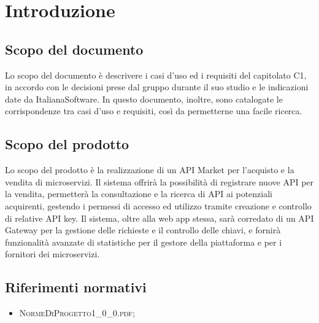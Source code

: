 \newpage
\section{Introduzione}

\subsection{Scopo del documento}
Lo scopo del documento è descrivere i casi d'uso ed i requisiti del capitolato C1, in accordo con le decisioni prese dal gruppo durante il suo studio e le indicazioni date da ItalianaSoftware. In questo documento, inoltre, sono catalogate le corrispondenze tra casi d'uso e requisiti, così da permetterne una facile ricerca.

\subsection{Scopo del prodotto}
Lo scopo del prodotto è la realizzazione di un API Market per l'acquisto e la vendita di microservizi. Il sistema offrirà la possibilità di registrare nuove API per la vendita, permetterà la consultazione e la ricerca di API ai potenziali acquirenti, gestendo i permessi di accesso ed utilizzo tramite creazione e controllo di relative API key. Il sistema, oltre alla web app stessa, sarà corredato di un API Gateway per la gestione delle richieste e il controllo delle chiavi, e fornirà funzionalità avanzate di statistiche per il gestore della piattaforma e per i fornitori dei microservizi.

\subsection{Riferimenti normativi}
\begin{itemize}
	\item \textsc{NormeDiProgetto1\_0\_0.pdf};
\end{itemize}

